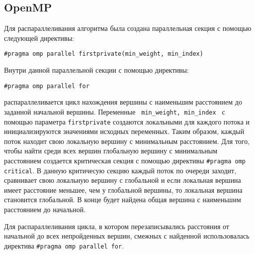 \documentclass{report}
\begin{document}
\subsection*{OpenMP}
Для распараллеливания алгоритма была создана параллельная секция с помощью следующей директивы:
\par \verb|#pragma omp parallel firstprivate(min_weight, min_index)| 
\par Внутри данной параллельной секции с помощью директивы: 
\par\verb|#pragma omp parallel for | 
\par распараллеливается цикл нахождения вершины с наименьшим расстоянием до заданной начальной вершины. Переменные \verb| min_weight, min_index | с помощью параметра \verb|firstprivate| создаются локальными для каждого потока и инициализируются значениями исходных переменных. Таким образом, каждый поток находит свою локальную вершину с минимальным расстоянием. Для того, чтобы найти среди всех вершин глобальную вершину с минимальным расстоянием создается критическая секция с помощью директивы \verb|#pragma omp critical|. В данную критичесую секцию каждый поток по очереди заходит, сравнивает свою локальную вершину с глобальной и если локальная вершина имеет расстояние меньшее, чем у глобальной вершины, то локальная вершина становится глобальной. В конце будет найдена общая вершина с наименьшим расстоянием до начальной.
\par Для распараллеливания цикла, в котором перезаписывались расстояния от начальной до всех непройденных вершин, смежных с найденной использовалась директива \verb|#pragma omp parallel for|.
\end{document}
